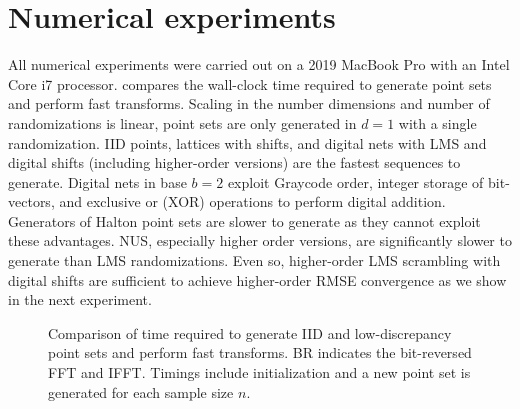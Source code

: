 \documentclass[acmsmall]{acmart}
\begin{document}
\begin{listing}[H]
    \inputminted{python}{snippets/si_lattice_2.txt}
    \caption{Efficient FFTBR update after doubling the sample size. Code continues from .}
    \label{code:si_lattice_2}
\end{listing}

\section{Numerical experiments} \label{sec:numerical_experiments}

All numerical experiments were carried out on a 2019 MacBook Pro with an Intel Core i7 processor.  compares the wall-clock time required to generate point sets and perform fast transforms. Scaling in the number dimensions and number of randomizations is linear, point sets are only generated in $d=1$ with a single randomization.  IID points, lattices with shifts, and digital nets with LMS and digital shifts (including higher-order versions) are the fastest sequences to generate. Digital nets in base $b=2$ exploit Graycode order, integer storage of bit-vectors, and exclusive or (XOR) operations to perform digital addition. Generators of Halton point sets are slower to generate as they cannot exploit these advantages. NUS, especially higher order versions, are significantly slower to generate than LMS randomizations. Even so, higher-order LMS scrambling with digital shifts are sufficient to achieve higher-order RMSE convergence as we show in the next experiment.  

\begin{figure}%
    \centering
    \caption{Comparison of time required to generate IID and low-discrepancy point sets and perform fast transforms. BR indicates the bit-reversed FFT and IFFT. Timings include initialization and a new point set is generated for each sample size $n$.}
    \Description[]{}
    \label{fig:timing}
\end{figure}
\end{document}
